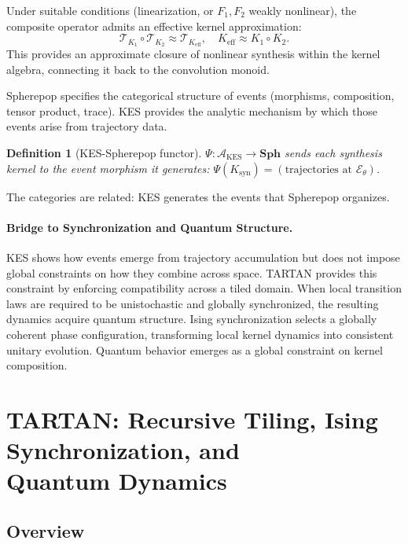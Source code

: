\documentclass[12pt]{article}
\newtheorem{definition}[theorem]{Definition}
\begin{document}
Under suitable conditions (linearization, or $F_1, F_2$ weakly nonlinear),
the composite operator admits an effective kernel approximation:
\[
  \mathcal{T}_{K_1}\circ\mathcal{T}_{K_2} \approx \mathcal{T}_{K_{\mathrm{eff}}},
  \quad K_{\mathrm{eff}} \approx K_1 \circ K_2.
\]
This provides an approximate closure of nonlinear synthesis within the kernel
algebra, connecting it back to the convolution monoid.

Spherepop specifies the categorical structure of events (morphisms,
composition, tensor product, trace). KES provides the analytic mechanism
by which those events arise from trajectory data.

\begin{definition}[KES-Spherepop functor]
$\Psi \colon \mathcal{A}_{\mathrm{KES}} \to \mathbf{Sph}$ sends each
synthesis kernel to the event morphism it generates:
$\Psi(K_{\mathrm{syn}}) = (\text{trajectories at }\mathcal{E}_\theta)$.
\end{definition}

The categories are related: KES generates the events that Spherepop
organizes.

\paragraph{Bridge to Synchronization and Quantum Structure.}
KES shows how events emerge from trajectory accumulation but does not
impose global constraints on how they combine across space. TARTAN provides
this constraint by enforcing compatibility across a tiled domain. When
local transition laws are required to be unistochastic and globally
synchronized, the resulting dynamics acquire quantum structure. Ising
synchronization selects a globally coherent phase configuration,
transforming local kernel dynamics into consistent unitary evolution.
Quantum behavior emerges as a global constraint on kernel composition.

\section{TARTAN: Recursive Tiling, Ising Synchronization, and\\Quantum Dynamics}
\label{sec:tartan}

\subsection{Overview}
\end{document}
